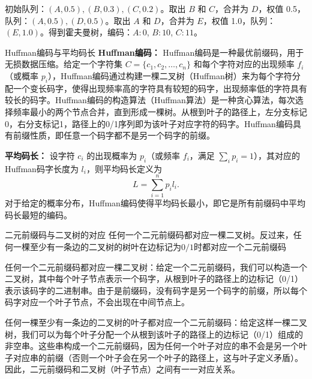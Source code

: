 初始队列：$(A,0.5), (B,0.3), (C,0.2)$。取出 $B$ 和 $C$，合并为 $D$，权值 0.5，队列：$(A,0.5), (D,0.5)$。取出 $A$ 和 $D$，合并为 $E$，权值 1.0，队列：$(E,1.0)$。得到霍夫曼树，编码：$A:0$, $B:10$, $C:11$。
\begin{definition}{Huffman编码与平均码长}{}
\textbf{Huffman编码：} Huffman编码是一种最优前缀码，用于无损数据压缩。给定一个字符集 $C = \{c_1, c_2, \dots, c_n\}$ 和每个字符对应的出现频率 $f_i$（或概率 $p_i$），Huffman编码通过构建一棵二叉树（Huffman树）来为每个字符分配一个变长码字，使得出现频率高的字符具有较短的码字，出现频率低的字符具有较长的码字。Huffman编码的构造算法（Huffman算法）是一种贪心算法，每次选择频率最小的两个节点合并，直到形成一棵树。从根到叶子的路径上，左分支标记0，右分支标记1，路径上的0/1序列即为该叶子对应字符的码字。Huffman编码具有前缀性质，即任意一个码字都不是另一个码字的前缀。

\textbf{平均码长：} 设字符 $c_i$ 的出现概率为 $p_i$（或频率 $f_i$，满足 $\sum_i p_i = 1$），其对应的Huffman码字长度为 $l_i$，则平均码长定义为
\[
L = \sum_{i=1}^n p_i l_i.
\]
对于给定的概率分布，Huffman编码使得平均码长最小，即它是所有前缀码中平均码长最短的编码。
\end{definition}
\begin{theorem}{二元前缀码与二叉树的对应}{}
任何一个二元前缀码都对应一棵二叉树。反过来，任何一棵至少有一条边的二叉树的树叶在边标记为$0/1$时都对应一个二元前缀码
\end{theorem}
任何一个二元前缀码都对应一棵二叉树：给定一个二元前缀码，我们可以构造一个二叉树，其中每个叶子节点表示一个码字，从根到叶子的路径上的边标记（0/1）表示该码字的二进制串。由于是前缀码，没有码字是另一个码字的前缀，所以每个码字对应一个叶子节点，不会出现在中间节点上。

任何一棵至少有一条边的二叉树的叶子都对应一个二元前缀码：给定这样一棵二叉树，我们可以为每个叶子分配一个从根到该叶子的路径上的边标记（0/1）组成的非空串。这些串构成一个二元前缀码，因为任何一个叶子对应的串不会是另一个叶子对应串的前缀（否则一个叶子会在另一个叶子的路径上，这与叶子定义矛盾）。
因此，二元前缀码和二叉树（叶子节点）之间有一一对应关系。
